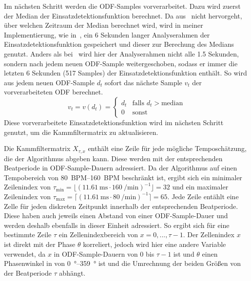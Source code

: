 {{{			%
			Im nächsten Schritt werden die ODF-Samples vorverarbeitet.
			Dazu wird zuerst der Median der Einsatzdetektionsfunktion berechnet.
			Da aus~\cite{2011_PlRoSt} nicht hervorgeht, über welchen Zeitraum der Median berechnet wird,
				wird in meiner Implementierung,
				wie in~\cite{2009_DaPlSt},
				ein \num{6} Sekunden langer Analyserahmen der Einsatzdetektionsfunktion gespeichert
				und dieser zur Berechung des Medians genutzt.
			Anders als bei~\cite{2009_DaPlSt} wird hier der Analyserahmen nicht alle \num{1.5} Sekunden,
				sondern nach jedem neuen ODF-Sample weitergeschoben,
				sodass er immer die letzten \num{6} Sekunden (\num{517} Samples) der Einsatzdetektionsfunktion enthält.
			So wird aus jedem neuen ODF-Sample $d_t$ sofort das nächste Sample $v_t$ der vorverarbeiteten ODF berechnet.
			\begin{equation}
				v_t = v(d_t) =
				\begin{cases}
					d_t & \text{falls } d_t > \text{median} \\
					0    & \text{sonst}
				\end{cases}
			\end{equation}
			Diese vorverarbeitete Einsatzdetektionsfunktion wird im nächsten Schritt genutzt,
				um die Kammfiltermatrix zu aktualisieren.

			Die Kammfiltermatrix $X_{\tau, x}$ enthält eine Zeile für jede mögliche Temposchätzung, die der Algorithmus abgeben kann.
			Diese werden mit der entsprechenden Beatperiode in ODF-Sample-Dauern adressiert.
			Da der Algorithmus auf einen Tempobereich von \SIrange{80}{160}{BPM} beschränkt ist,
				ergibt sich ein minimaler Zeilenindex von
				$\tau_{\text{min}} = \lfloor(\SI{11.61}{\milli\second} \cdot \SI{160}{\per\minute})^{-1}\rfloor = 32$
				und ein maximaler Zeilenindex von
				$\tau_{\text{max}} = \lceil(\SI{11.61}{\milli\second} \cdot \SI{80}{\per\minute})^{-1}\rceil = 65$.
			Jede Zeile entählt eine Zelle für jeden diskreten Zeitpunkt innerhalb der entsprechenden Beatperiode.
			Diese haben auch jeweils einen Abstand von einer ODF-Sample-Dauer
				und werden deshalb ebenfalls in dieser Einheit adressiert.
			So ergibt sich für eine bestimmte Zeile $\tau$ ein Zellenindexbereich von $x = 0, ..., \tau - 1$.
			Der Zellenindex $x$ ist direkt mit der Phase $\theta$ korreliert,
				jedoch wird hier eine andere Variable verwendet,
				da $x$ in ODF-Sample-Dauern von $0$ bis $\tau - 1$ ist
				und $\theta$ einen Phasenwinkel in von \SIrange{0}{359}{\degree} ist
				und die Umrechnung der beiden Größen von der Beatperiode $\tau$ abhängt.

}}}
